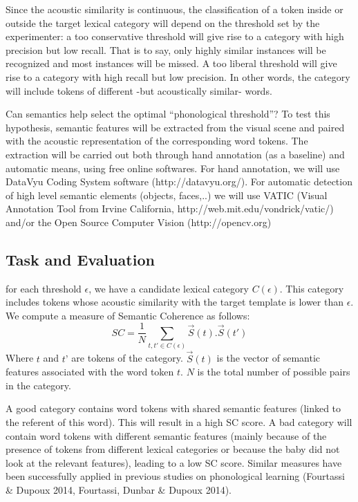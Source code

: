 \documentclass[12pt]{article}
\begin{document}
Since the acoustic similarity is continuous, the classification of a token inside or outside the target lexical category will depend on the threshold set by the experimenter: a too conservative threshold will give rise to a category with high precision but low recall. That is to say, only highly similar instances will be recognized and most instances will be missed. A too liberal threshold will give rise to a category with high recall but low precision. In other words, the category will include tokens of different -but acoustically similar- words.

Can semantics  help select the optimal “phonological threshold”?  
To test this hypothesis, semantic features will be extracted from the visual scene and paired with the acoustic representation of the corresponding word tokens. The extraction will be carried out both through hand annotation (as a baseline) and automatic means, using free online softwares. 
For hand annotation, we will use DataVyu Coding System software (http://datavyu.org/).
For automatic detection of high level semantic elements (objects, faces,..) we will use VATIC (Visual Annotation Tool from Irvine California, http://web.mit.edu/vondrick/vatic/) and/or the Open Source Computer Vision (http://opencv.org) 

\subsection*{Task and Evaluation}
for each threshold $\epsilon$,  we have a candidate lexical category $C(\epsilon)$. This category includes tokens whose acoustic similarity with the target template is lower than $\epsilon$.
We compute a measure of Semantic Coherence as follows:
$$
SC=\frac{1}{N} \sum_{t,t' \in C(\epsilon)}\vec{S}(t). \vec{S}(t')
$$
Where $t$ and $t’$ are tokens of the category.  $\vec{S}(t)$ is the vector of semantic features associated with the word token $t$. $N$ is the total number of possible pairs in the category.

A good category contains word tokens with shared semantic features (linked to the referent of this word). This will result in a high SC score.   A bad category will contain word tokens with different semantic features (mainly because of the presence of tokens from different lexical categories or because the baby did not look at the relevant features), leading to a low SC score. Similar measures have been successfully applied in previous studies on phonological learning (Fourtassi \& Dupoux 2014, Fourtassi, Dunbar \& Dupoux 2014). 
\end{document}
